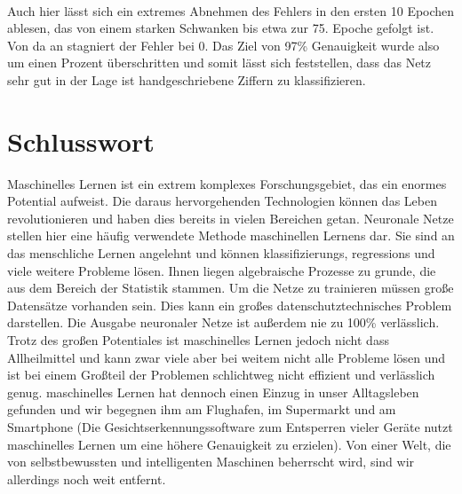 \documentclass{article}
\begin{document}
\\
Auch hier lässt sich ein extremes Abnehmen des Fehlers in den ersten 10 Epochen ablesen, das von einem starken Schwanken bis etwa zur 75. Epoche gefolgt ist. Von da an stagniert der Fehler bei 0. Das Ziel von 97\% Genauigkeit wurde also um einen Prozent überschritten und somit lässt sich feststellen, dass das Netz sehr gut in der Lage ist handgeschriebene Ziffern zu klassifizieren.
\section{Schlusswort}
Maschinelles Lernen ist ein extrem komplexes Forschungsgebiet, das ein enormes Potential aufweist. Die daraus hervorgehenden Technologien können das Leben revolutionieren und haben dies bereits in vielen Bereichen getan. Neuronale Netze stellen hier eine häufig verwendete Methode maschinellen Lernens dar. Sie sind an das menschliche Lernen angelehnt und können klassifizierungs, regressions und viele weitere Probleme lösen. Ihnen liegen algebraische Prozesse zu grunde, die aus dem Bereich der Statistik stammen. Um die Netze zu trainieren müssen große Datensätze vorhanden sein. Dies kann ein großes datenschutztechnisches Problem darstellen. Die Ausgabe neuronaler Netze ist außerdem nie zu 100\% verlässlich. Trotz des großen Potentiales ist maschinelles Lernen jedoch nicht dass Allheilmittel und kann zwar viele aber bei weitem nicht alle Probleme lösen und ist bei einem Großteil der  Problemen schlichtweg nicht effizient und verlässlich genug. maschinelles Lernen hat dennoch einen Einzug in unser Alltagsleben gefunden und wir begegnen ihm am Flughafen, im Supermarkt und am Smartphone (Die Gesichtserkennungssoftware zum Entsperren vieler Geräte nutzt maschinelles Lernen um eine höhere Genauigkeit zu erzielen). Von einer Welt, die von selbstbewussten und intelligenten Maschinen beherrscht wird, sind wir allerdings noch weit entfernt.
\newpage
\end{document}
